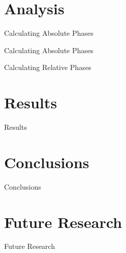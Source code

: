 \documentclass[pdf]{beamer}
\begin{document}
\section{Analysis}
\begin{frame}{Calculating Absolute Phases}

\end{frame}

\begin{frame}{Calculating Absolute Phases}

\end{frame}

\begin{frame}{Calculating Relative Phases}

\end{frame}

\section{Results}
\begin{frame}{Results}

\end{frame}

\section{Conclusions}
\begin{frame}{Conclusions}

\end{frame}

\section{Future Research}
\begin{frame}{Future Research}

\end{frame}
\end{document}
